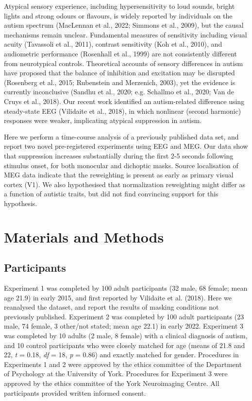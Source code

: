 \documentclass[
]{article}
\begin{document}
Atypical sensory experience, including hypersensitivity to loud sounds, bright lights and strong odours or flavours, is widely reported by individuals on the autism spectrum (MacLennan et al., 2022; Simmons et al., 2009), but the causal mechanisms remain unclear. Fundamental measures of sensitivity including visual acuity (Tavassoli et al., 2011), contrast sensitivity (Koh et al., 2010), and audiometric performance (Rosenhall et al., 1999) are not consistently different from neurotypical controls. Theoretical accounts of sensory differences in autism have proposed that the balance of inhibition and excitation may be disrupted (Rosenberg et al., 2015; Rubenstein and Merzenich, 2003), yet the evidence is currently inconclusive (Sandhu et al., 2020; e.g. Schallmo et al., 2020; Van de Cruys et al., 2018). Our recent work identified an autism-related difference using steady-state EEG (Vilidaite et al., 2018), in which nonlinear (second harmonic) responses were weaker, implicating atypical suppression in autism.

Here we perform a time-course analysis of a previously published data set, and report two novel pre-registered experiments using EEG and MEG. Our data show that suppression increases substantially during the first 2-5 seconds following stimulus onset, for both monocular and dichoptic masks. Source localisation of MEG data indicate that the reweighting is present as early as primary visual cortex (V1). We also hypothesised that normalization reweighting might differ as a function of autistic traits, but did not find convincing support for this hypothesis.

\hypertarget{materials-and-methods}{%
\section{Materials and Methods}\label{materials-and-methods}}

\hypertarget{participants}{%
\subsection{Participants}\label{participants}}

Experiment 1 was completed by 100 adult participants (32 male, 68 female; mean age 21.9) in early 2015, and first reported by Vilidaite et al. (2018). Here we reanalysed the dataset, and report the results of masking conditions not previously published. Experiment 2 was completed by 100 adult participants (23 male, 74 female, 3 other/not stated; mean age 22.1) in early 2022. Experiment 3 was completed by 10 adults (2 male, 8 female) with a clinical diagnosis of autism, and 10 control participants who were closely matched for age (means of 21.8 and 22, \emph{t} = 0.18, \emph{df} = 18, \emph{p} = 0.86) and exactly matched for gender. Procedures in Experiments 1 and 2 were approved by the ethics committee of the Department of Psychology at the University of York. Procedures for Experiment 3 were approved by the ethics committee of the York Neuroimaging Centre. All participants provided written informed consent.
\end{document}
